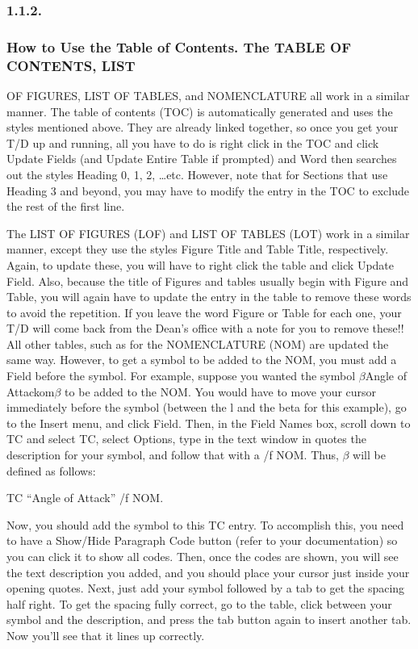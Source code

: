 \documentclass{article}
\newcommand{\tab}{\hspace{5mm}}
\begin{document}
\subsubsection*{1.1.2.\tab }


\subsubsection*{
How to Use the Table of Contents. The TABLE OF CONTENTS, LIST}

OF FIGURES, LIST OF TABLES, and NOMENCLATURE all work in a similar manner. 
The table of contents (TOC) is automatically generated and uses 
the styles mentioned above. They are already linked together, 
so once you get your T/D up and running, all you have to do is 
right click in the TOC and click Update Fields (and Update Entire 
Table if prompted) and Word then searches out the styles Heading 
0, 1, 2, \dots etc. However, note that for Sections that use Heading 
3 and beyond, you may have to modify the entry in the TOC to 
exclude the rest of the first line. 


The LIST OF FIGURES (LOF) and LIST OF TABLES (LOT) work in a 
similar manner, except they use the styles Figure Title and Table 
Title, respectively. Again, to update these, you will have to 
right click the table and click Update Field. Also, because the 
title of Figures and tables usually begin with Figure and Table, 
you will again have to update the entry in the table to remove 
these words to avoid the repetition. If you leave the word Figure 
or Table for each one, your T/D will come back from the Dean's 
office with a note for you to remove these!!\\
All other tables, such as for the NOMENCLATURE (NOM) are updated 
the same way. However, to get a symbol to be added to the NOM, 
you must add a Field before the symbol. For example, suppose 
you wanted the symbol 
\ensuremath{\beta}\tab  Angle of Attackom\ensuremath{\beta} to be added to the NOM. You would have to move your 
cursor immediately before the symbol (between the l and the beta 
for this example), go to the Insert menu, and click Field. Then, 
in the Field Names box, scroll down to TC and select TC, select 
Options, type in the text window in quotes the description for 
your symbol, and follow that with a /f NOM. Thus, \ensuremath{\beta} will 
be defined as follows:


\tab TC ``Angle of Attack'' /f NOM.


Now, you should add the symbol to this TC entry. To accomplish 
this, you need to have a Show/Hide Paragraph Code button (refer 
to your documentation) so you can click it to show all codes. 
Then, once the codes are shown, you will see the text description 
you added, and you should place your cursor just inside your 
opening quotes. Next, just add your symbol followed by a tab 
to get the spacing half right. To get the spacing fully correct, 
go to the table, click between your symbol and the description, 
and press the tab button again to insert another tab. Now you'll 
see that it lines up correctly.
\end{document}
